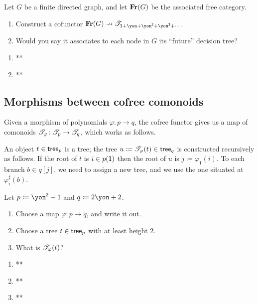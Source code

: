 \documentclass[Book-Poly]{subfiles}
\begin{document}
\begin{exercise}
Let $G$ be a finite directed graph, and let $\mathbf{Fr}(G)$ be the associated free category. 
\begin{enumerate}
	\item Construct a cofunctor $\Cat{Fr}(G)\cof\cofree{\1+\yon+\yon^\2+\yon^\3+\cdots}$.
	\item Would you say it associates to each node in $G$ its ``future'' decision tree?
\qedhere
\end{enumerate}
\begin{solution}
\begin{enumerate}
    \item **
    \item **
\end{enumerate}
\end{solution}
\end{exercise}

\subsection{Morphisms between cofree comonoids}
Given a morphism of polynomials $\varphi \colon p \to q$, the cofree functor gives us a map of comonoids $\mathscr{T}_{\varphi} \colon \mathscr{T}_{p} \to \mathscr{T}_{q}$, which works as follows.

An object $t \in \mathsf{tree}_p$ is a tree; the tree $u \coloneqq \mathscr{T}_{\varphi} (t) \in \mathsf{tree}_q $ is constructed recursively as follows. If the root of $t$ is $i \in p(\textsf{1})$ then the root of $u$ is $j \coloneqq \varphi_1 (i)$. To each branch $b \in q[j]$, we need to assign a new tree, and we use the one situated at $\varphi_i ^ \sharp (b)$.

\begin{exercise}
Let $p \coloneqq \yon ^\2 + \1$ and $q \coloneqq \2 \yon + \2$.
\begin{enumerate}
    \item Choose a map $\varphi \colon p \to q$, and write it out.
    \item Choose a tree $t \in \mathsf{tree}_p$ with at least height $2$.
    \item What is $\mathscr{T}_{\varphi}(t)$?
    \qedhere
\end{enumerate}
\begin{solution}
\begin{enumerate}
    \item **
    \item **
    \item **
\end{enumerate}
\end{solution}
\end{exercise}
\end{document}

